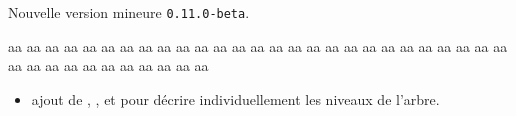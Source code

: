 Nouvelle version mineure \verb+0.11.0-beta+.

aa aa aa aa aa aa aa aa aa aa aa aa aa aa aa aa aa aa aa aa aa aa aa aa aa aa aa aa aa aa aa aa aa aa aa aa aa aa 
\begin{itemize}[itemsep=.5em]
    \item {}
    	  ajout de , ,  et  pour décrire individuellement les niveaux de l'arbre.
\end{itemize}